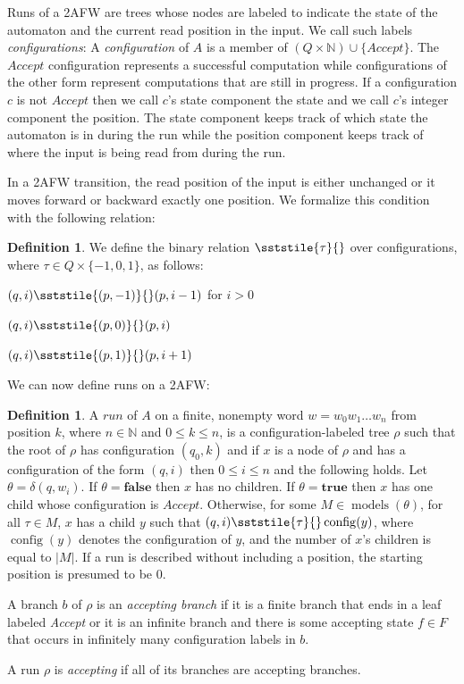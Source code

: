 \documentclass{lmcs}
\theoremstyle{definition}
\newtheorem{definition}[thm]{Definition}
\newcommand{\sderives}[1]{\sststile{#1}{}}
\DeclareMathOperator{\config}{config}
\DeclareMathOperator{\?}{?}
\DeclareMathOperator{\mymodels}{models}
\begin{document}
Runs of a 2AFW are trees whose nodes are labeled to indicate the state of the automaton and
    the current read position in the input. We call such labels \textit{configurations}: A \textit{configuration} of $A$ is a member of $(Q \times \mathbb{N}) \cup \{Accept\}$. The $Accept$
configuration represents a successful computation while configurations of the other form represent
computations that are still in progress.  If a
configuration $c$ is not $Accept$ then we call $c$'s state component the state and
we call $c$'s integer component the position. The state component keeps track of which state the automaton
is in during the run while the position component keeps track of where the input is being read from during the run.

In a 2AFW transition, the read position of the input is either unchanged or it moves forward or
backward exactly one position. We formalize this condition with the following relation:

    \begin{definition}\label{def:sderives}
We define the binary relation $\sderives{\tau}$ over configurations, where $\tau \in Q \times
\{-1,0,1\}$, as follows:

$(q,i) \sderives{(p,-1)} (p,i-1)$ for $i > 0$

$(q,i) \sderives{(p,0)} (p,i)$

$(q,i) \sderives{(p,1)} (p, i+1)$

    \end{definition}

    We can now define runs on a 2AFW:

\begin{definition}\label{def:run}
A $run$ of $A$ on a finite, nonempty word $w = w_0w_1 \ldots w_n$ from position $k$, where $n \in \mathbb{N}$ and $0 \leq k \leq n$, is a configuration-labeled tree $\rho$ such that the root of $\rho$ has configuration $(q_0, k)$ and if $x$ is a node of $\rho$ and has a configuration of the form $(q,i)$ then $0 \leq i \leq n$ and the following holds. Let $\theta = \delta(q,w_i)$. If $\theta = \textbf{false}$ then $x$ has no children.  If $\theta = \textbf{true}$ then $x$ has one child whose configuration is $\textit{Accept}$. Otherwise, for some $M \in \mymodels(\theta)$, for all $\tau \in M$, $x$ has a child $y$ such that $(q,i) \sderives{\tau} \config (y)$, where $\config (y)$ denotes the configuration of $y$, and the number of $x$'s children is equal to $|M|$. If a run is described without including a position, the starting position is presumed to be 0.

A branch $b$ of $\rho$ is an \textit{accepting branch} if it is a finite branch that ends in a leaf labeled \textit{Accept} or it is an infinite branch and there is some accepting state $f \in F$ that occurs in infinitely many configuration labels in $b$.

A run $\rho$ is \textit{accepting} if all of its branches are accepting branches.
\end{definition}
\end{document}

